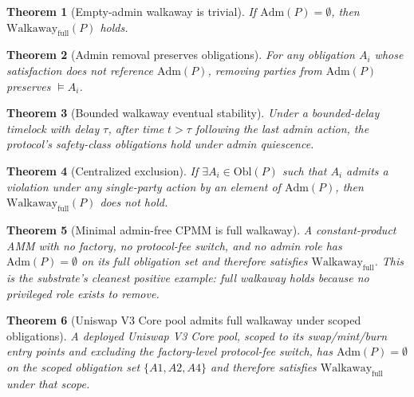 \documentclass[11pt,a4paper]{article}
\newtheorem{theorem}{Theorem}
\begin{document}
\begin{theorem}[Empty-admin walkaway is trivial]\label{thm:walkaway-empty}
If $\mathrm{Adm}(P) = \emptyset$, then $\mathrm{Walkaway}_{\mathrm{full}}(P)$ holds.
\end{theorem}

\begin{theorem}[Admin removal preserves obligations]\label{thm:admin-removal}
For any obligation $A_i$ whose satisfaction does not reference $\mathrm{Adm}(P)$, removing parties from $\mathrm{Adm}(P)$ preserves $\models A_i$.
\end{theorem}

\begin{theorem}[Bounded walkaway eventual stability]\label{thm:bounded-eventual}
Under a bounded-delay timelock with delay $\tau$, after time $t > \tau$ following the last admin action, the protocol's safety-class obligations hold under admin quiescence.
\end{theorem}

\begin{theorem}[Centralized exclusion]\label{thm:centralized-excluded}
If $\exists A_i \in \mathrm{Obl}(P)$ such that $A_i$ admits a violation under any single-party action by an element of $\mathrm{Adm}(P)$, then $\mathrm{Walkaway}_{\mathrm{full}}(P)$ does not hold.
\end{theorem}

\begin{theorem}[Minimal admin-free CPMM is full walkaway]\label{thm:cpmm-walkaway}
A constant-product AMM with no factory, no protocol-fee switch, and no admin role has $\mathrm{Adm}(P) = \emptyset$ on its full obligation set and therefore satisfies $\mathrm{Walkaway}_{\mathrm{full}}$. This is the substrate's cleanest positive example: full walkaway holds because no privileged role exists to remove.
\end{theorem}

\begin{theorem}[Uniswap V3 Core pool admits full walkaway under scoped obligations]\label{thm:uniswap-walkaway}
A deployed Uniswap V3 Core pool, scoped to its swap/mint/burn entry points and excluding the factory-level protocol-fee switch, has $\mathrm{Adm}(P) = \emptyset$ on the scoped obligation set $\{A1, A2, A4\}$ and therefore satisfies $\mathrm{Walkaway}_{\mathrm{full}}$ under that scope.
\end{theorem}
\end{document}

